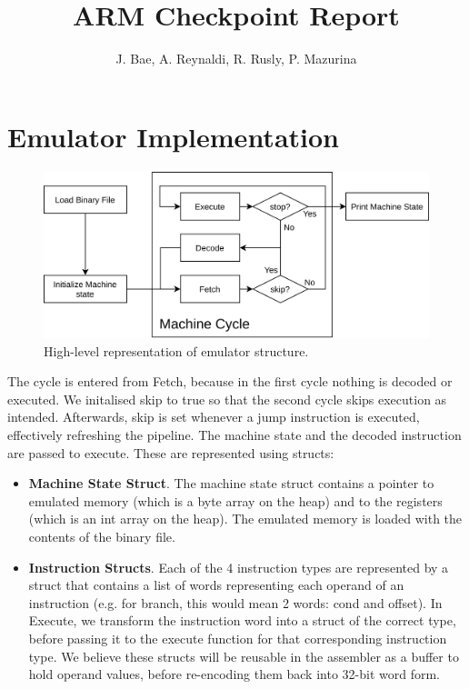 \documentclass[11pt]{article}
\begin{document}
\title{ARM Checkpoint Report}
\author{J. Bae, A. Reynaldi, R. Rusly, P. Mazurina}

\maketitle

\section{Emulator Implementation}
\begin{figure}[h]
  \centering
  \includegraphics[width=0.7\linewidth]{emulator_structure.png}
  \caption{High-level representation of emulator structure.}
\end{figure}
The cycle is entered from Fetch, because in the first cycle nothing is decoded
or executed. We initalised skip to true so that the second cycle skips
execution as intended. Afterwards, skip is set whenever a jump instruction is
executed, effectively refreshing the pipeline. The machine state and the
decoded instruction are passed to execute. These are represented using structs:
\begin{itemize}
    \item \textbf{Machine State Struct}. The machine state struct contains a
    pointer to emulated memory (which is a byte array on the heap) and to the
    registers (which is an int array on the heap). The emulated memory is
    loaded with the contents of the binary file.
    \item \textbf{Instruction Structs}. Each of the 4 instruction types are
    represented by a struct that contains a list of words representing each
    operand of an instruction (e.g. for branch, this would mean 2 words: cond
    and offset). In Execute, we transform the instruction word into a struct of
    the correct type, before passing it to the execute function for that
    corresponding instruction type. We believe these structs will be reusable
    in the assembler as a buffer to hold operand values, before re-encoding
    them back into 32-bit word form.
\end{itemize}
\end{document}
